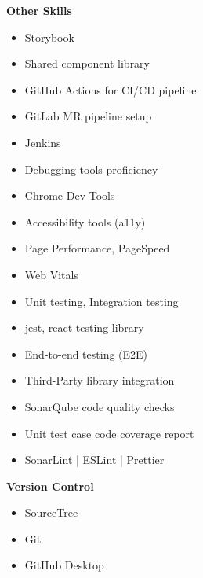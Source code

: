 \documentclass[letterpaper]{deedy-resume} %
\begin{document}
\begin{minipage}[t]{0.33\textwidth}
\vspace{-\topsep}


\textbf{Other Skills}
\vspace{-\topsep}

\begin{itemize}
\setlength\itemsep{-0.5em} %
\item Storybook
\item Shared component library
\item GitHub Actions for CI/CD pipeline
\item GitLab MR pipeline setup
\item Jenkins
\item Debugging tools proficiency
\item Chrome Dev Tools
\item Accessibility tools (a11y)
\item Page Performance, PageSpeed
\item Web Vitals
\item Unit testing, Integration testing
\item jest, react testing library
\item End-to-end testing (E2E)
\item Third-Party library integration
\item SonarQube code quality checks
\item Unit test case code coverage report
\item SonarLint | ESLint | Prettier
\end{itemize}


\vspace{-\topsep}


\textbf{Version Control}
\vspace{-\topsep}

\begin{itemize}
\setlength\itemsep{-0.5em} %
\item SourceTree
\item Git
\item GitHub Desktop
\end{itemize}



\end{minipage}
\end{document}
